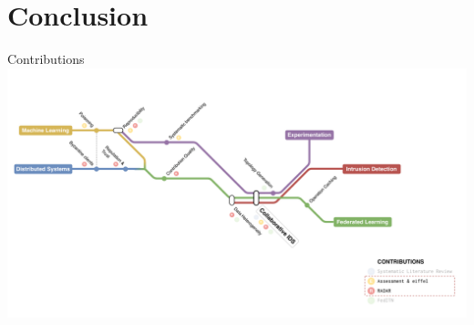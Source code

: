 

\setlength{\titleoffset}{0pt}
\section*{Conclusion}

\begin{frame}
  \sectionpage
\end{frame}

\begin{frame}{Contributions}
  \centering
  \vspace{-.3cm}
  \includegraphics[width=1.1\textwidth, center]{figures/intro/metro/10.pdf}%
  
\end{frame}



